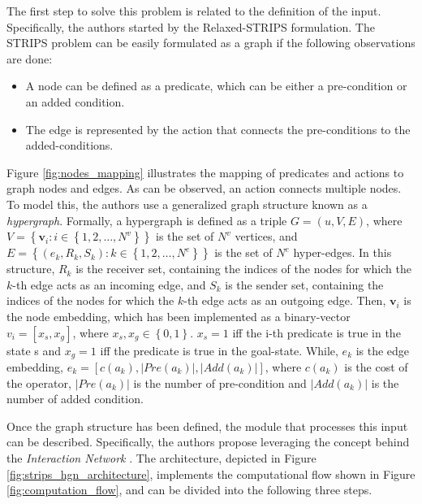 The first step to solve this problem is related to the definition of the input. Specifically, the authors started by the Relaxed-STRIPS formulation. The STRIPS problem can be easily formulated as a graph if the following observations are done:
\begin{itemize}
    \item A node can be defined as a predicate, which can be either a pre-condition or an added condition.
    \item The edge is represented by the action that connects the pre-conditions to the added-conditions. 
\end{itemize}

Figure \ref{fig:nodes_mapping} illustrates the mapping of predicates and actions to graph nodes and edges. As can be observed, an action connects multiple nodes. To model this, the authors use a generalized graph structure known as a \textit{hypergraph}. Formally, a hypergraph is defined as a triple $G = (u, V, E)$, where $V = \left\{ \textbf{v}_{i}: i \in \left\{1, 2, \dots, N^{v} \right\} \right\}$ is the set of $N^{v}$ vertices, and $E = \left\{ (e_{k}, R_{k}, S_{k}): k \in \left\{1, 2, \dots, N^{e} \right\} \right\}$ is the set of $N^{e}$ hyper-edges. In this structure, $R_{k}$ is the receiver set, containing the indices of the nodes for which the $k$-th edge acts as an incoming edge, and $S_{k}$ is the sender set, containing the indices of the nodes for which the $k$-th edge acts as an outgoing edge. Then, $\textbf{v}_{i}$ is the node embedding, which has been implemented as a binary-vector $v_i = [x_s, x_g]$, where $x_s, x_g \in \left\{0,1\right\}$. $x_s=1$ iff the i-th predicate is true in the state s and $x_g=1$ iff the predicate is true in the goal-state. While, $e_{k}$ is the edge embedding, $e_k = [c(a_k), |Pre(a_k)|, |Add(a_k)|]$, where $c(a_k)$ is the cost of the operator, $|Pre(a_k)|$ is the number of pre-condition and $|Add(a_k)|$ is the number of added condition.



Once the graph structure has been defined, the module that processes this input can be described. Specifically, the authors propose leveraging the concept behind the \textit{Interaction Network} \cite{battaglia2016interaction}. The architecture, depicted in Figure \ref{fig:strips_hgn_architecture}, implements the computational flow shown in Figure \ref{fig:computation_flow}, and can be divided into the following three steps.

